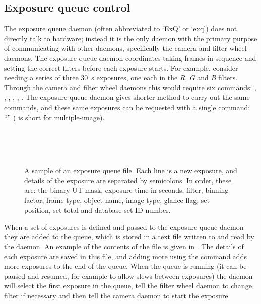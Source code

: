 \subsection{Exposure queue control}
\label{sec:exq}
\begin{colsection}

The exposure queue daemon (often abbreviated to `ExQ' or `exq') does not directly talk to hardware; instead it is the only daemon with the primary purpose of communicating with other daemons, specifically the camera and filter wheel daemons. The exposure queue daemon coordinates taking frames in sequence and setting the correct filters before each exposure starts. For example, consider needing a series of three \SI{30}{\second} exposures, one each in the \textit{R}, \textit{G} and \textit{B} filters. Through the camera and filter wheel daemons this would require six commands: , , , , , . The exposure queue daemon gives shorter method to carry out the same commands, and these same exposures can be requested with a single command: ``'' ( is short for multiple-image).

\begin{figure}[t]
    \begin{center}
        \vspace{1cm}
        \\
        \\
        \\
        \vspace{0cm}
    \end{center}
    \caption[A sample exposure queue file]{
        A sample of an exposure queue file. Each line is a new exposure, and details of the exposure are separated by semicolons. In order, these are: the binary UT mask, exposure time in seconds, filter, binning factor, frame type, object name, image type, glance flag, set position, set total and database set ID number.
    }\label{fig:exq_file}
\end{figure}

When a set of exposures is defined and passed to the exposure queue daemon they are added to the queue, which is stored in a text file written to and read by the daemon. An example of the contents of the file is given in . The details of each exposure are saved in this file, and adding more using the  command adds more exposures to the end of the queue. When the queue is running (it can be paused and resumed, for example to allow slews between exposures) the daemon will select the first exposure in the queue, tell the filter wheel daemon to change filter if necessary and then tell the camera daemon to start the exposure.


\end{colsection}
